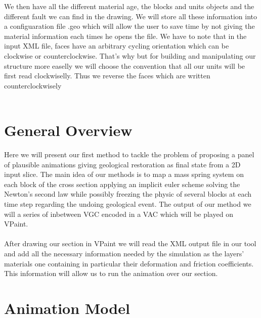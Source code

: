 \documentclass[12pt, a4paper]{memoir} %
\begin{document}
We then have all the different material age, the blocks and units objects and the different fault we can find in the drawing. We will store all these information into a configuaration file .geo which will allow the user to save time by not giving the material information each times he opens the file. We have to note that in the input XML file, faces have an arbitrary cycling orientation which can be clockwise or counterclockwise. That's why but for building and manipulating our structure more easelly we will choose the convention that all our units will be first read clockwiselly. Thus we reverse the faces which are written counterclockwisely\\\\

\section{General Overview}

Here we will present our first method to tackle the problem of proposing a panel of plausible animations giving geological restoration as final state from a 2D input slice. 
The main idea of our methods is to map a mass spring system on each block of the cross section applying an implicit euler scheme solving the Newton's second law while possibly freezing the physic of several blocks at each time step regarding the undoing geological event. The output of our method we will a series of inbetween VGC encoded in a VAC which will be played on VPaint.\\\\
After drawing our section in VPaint we will read the XML output file in our tool  and add all the necessary information needed by the simulation as the layers' materials one containing in particular their deformation and friction coefficients. This information will allow us to run the animation over our section.\\

\section{Animation Model}
\end{document}
